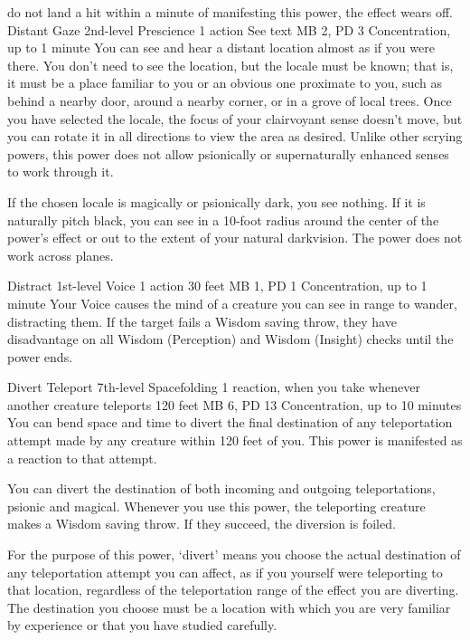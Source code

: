 do not land a hit within a minute of manifesting this power,
the effect wears off.
\DndPowerHeader%
    {Distant Gaze\label{pwr:distant_gaze}}
    {2nd-level Prescience}
    {1 action}
    {See text}
    {MB 2, PD 3}
    {Concentration, up to 1 minute}
You can see and hear a distant location almost
as if you were there. You don't need to see the location,
but the locale must be known; that is, it must be a place
familiar to you or an obvious one proximate to you, such as
behind a nearby door, around a nearby corner, or in a grove
of local trees. Once you have selected the locale, the focus
of your clairvoyant sense doesn't move, but you can rotate
it in all directions to view the area as desired. Unlike other
scrying powers, this power does not allow psionically or supernaturally
enhanced senses to work through it.

If the chosen locale is magically or psionically dark, you
see nothing. If it is naturally pitch black, you can see in
a 10-foot radius around the center of the power's effect
or out to the extent of your natural darkvision. The power
does not work across planes.

\DndPowerHeader%
    {Distract\label{pwr:distract}}
    {1st-level Voice}
    {1 action}
    {30 feet}
    {MB 1, PD 1}
    {Concentration, up to 1 minute}
Your Voice causes the mind of a creature
you can see in range to wander, distracting them. If the target
fails a Wisdom saving throw, they have disadvantage on all
Wisdom (Perception) and Wisdom (Insight) checks until the
power ends.

\DndPowerHeader%
    {Divert Teleport\label{pwr:divert_teleport}}
    {7th-level Spacefolding}
    {1 reaction, when you take whenever another creature teleports}
    {120 feet}
    {MB 6, PD 13}
    {Concentration, up to 10 minutes}
You can bend space and time to divert the
final destination of any teleportation attempt made by any
creature within 120 feet of you. This power is manifested
as a reaction to that attempt.

You can divert the destination of both incoming and outgoing
teleportations, psionic and magical. Whenever you use this
power, the teleporting creature makes a Wisdom saving throw.
If they succeed, the diversion is foiled.

For the purpose of this power, `divert' means you choose
the actual destination of any teleportation attempt you can
affect, as if you yourself were teleporting to that location,
regardless of the teleportation range of the effect you are
diverting. The destination you choose must be a location with
which you are very familiar by experience or that you have
studied carefully.

